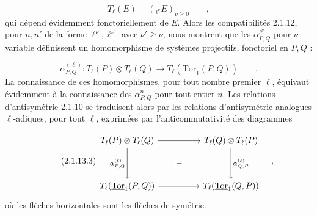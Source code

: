 \begin{equation}\tag{2.1.13.1}
T_\ell(E) = ({}_{\ell^\nu}E)_{\nu \geq 0} \qquad ,
\end{equation}
qui dépend évidemment fonctoriellement de $E$. Alors les compatibilités 2.1.12, pour $n,n'$ de la forme $\ell^\nu,\ell^{\nu'}$ avec $\nu' \geq \nu$, nous montrent que les $\alpha^{\ell^\nu}_{P,Q}$ pour $\nu$ variable définissent un homomorphisme de systèmes projectifs, fonctoriel en $P,Q$ :

\begin{equation}\tag{2.1.13.2}
\alpha^{(\ell)}_{P,Q} : T_\ell(P) \otimes T_\ell(Q) \longrightarrow T_\ell(\underline{\mathrm{Tor}}_1(P,Q)) \qquad .
\end{equation}
La connaissance de ces homomorphismes, pour tout nombre premier $\ell$, équivaut évidemment à la connaissance des $\alpha^n_{P,Q}$ pour tout entier $n$. Les relations d'antisymétrie 2.1.10 se traduisent alors par les relations d'antisymétrie analogues $\ell$-adiques, pour tout $\ell$, exprimées par l'anticommutativité des diagrammes

\begin{equation}\tag{2.1.13.3}
\begin{tikzcd}[column sep=huge, row sep=huge]
T_\ell(P) \otimes T_\ell(Q) \arrow[r] \arrow[d, "{\alpha^{(\ell)}_{P,Q}}"'] \arrow[rd, phantom, "-" description] & T_\ell(Q) \otimes T_\ell(P) \arrow[d, "{\alpha^{(\ell)}_{Q,P}}"] \\
T_\ell(\underline{\mathrm{Tor}}_1(P,Q)) \arrow[r] & T_\ell(\underline{\mathrm{Tor}}_1(Q,P))
\end{tikzcd}\quad ,
\end{equation}
où les flèches horizontales sont les flèches de symétrie.

